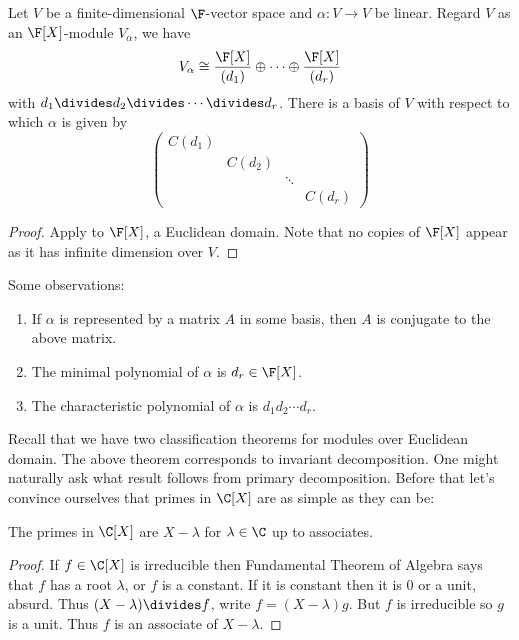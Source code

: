 \documentclass[a4paper]{article}
\theoremstyle{definition}
\begin{document}
\begin{theorem}
  Let \(V\) be a finite-dimensional \(\F\)-vector space and \(\alpha: V \to V\) be linear. Regard \(V\) as an \(\F[X]\)-module \(V_\alpha\), we have
  \[
    V_\alpha \cong \frac{\F[X]}{(d_1)} \oplus \dots \oplus \frac{\F[X]}{(d_r)}
  \]
  with \(d_1 \divides d_2 \divides \cdots \divides d_r\). There is a basis of \(V\) with respect to which \(\alpha\) is given by
  \[
    \begin{pmatrix}
      C(d_1) \\
      & C(d_2) \\
      & & \ddots \\
      & & & C(d_r)
    \end{pmatrix}
  \]
\end{theorem}

\begin{proof}
  Apply  to \(\F[X]\), a Euclidean domain. Note that no copies of \(\F[X]\) appear as it has infinite dimension over \(V\).
\end{proof}

Some observations:
\begin{enumerate}
\item If \(\alpha\) is represented by a matrix \(A\) in some basis, then \(A\) is conjugate to the above matrix.
\item The minimal polynomial of \(\alpha\) is \(d_r \in \F[X]\).
\item The characteristic polynomial of \(\alpha\) is \(d_1d_2\cdots d_r\).
\end{enumerate}

Recall that we have two classification theorems for modules over Euclidean domain. The above theorem corresponds to invariant decomposition. One might naturally ask what result follows from primary decomposition. Before that let's convince ourselves that primes in \(\C[X]\) are as simple as they can be:

\begin{lemma}
  The primes in \(\C[X]\) are \(X - \lambda\) for \(\lambda \in \C\) up to associates.
\end{lemma}

\begin{proof}
  If \(f \in \C[X]\) is irreducible then Fundamental Theorem of Algebra says that \(f\) has a root \(\lambda\), or \(f\) is a constant. If it is constant then it is \(0\) or a unit, absurd. Thus \((X - \lambda) \divides f\), write \(f = (X - \lambda) g\). But \(f\) is irreducible so \(g\) is a unit. Thus \(f\) is an associate of \(X - \lambda\).
\end{proof}
\end{document}
